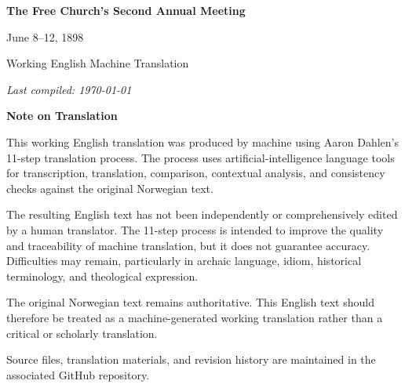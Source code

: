 \documentclass[12pt]{article}
\begin{document}
\begin{titlepage}
    \centering
    \vspace*{1.5in}

    {\LARGE\bfseries The Free Church’s Second Annual Meeting
 \par}

	\vspace{0.35in}
	{June 8–12, 1898\par}




    \vfill

    {\large Working English Machine Translation\par}
    \vspace{0.15in}


    \vspace{0.15in}
	
	\noindent\textit{Last compiled: \today}

\end{titlepage}



\pagestyle{plain}
\tableofcontents
\newpage


\textbf{Note on Translation}

This working English translation was produced by machine using Aaron Dahlen's 11-step translation process. The process uses artificial-intelligence language tools for transcription, translation, comparison, contextual analysis, and consistency checks against the original Norwegian text.

The resulting English text has not been independently or comprehensively edited by a human translator. The 11-step process is intended to improve the quality and traceability of machine translation, but it does not guarantee accuracy. Difficulties may remain, particularly in archaic language, idiom, historical terminology, and theological expression.

The original Norwegian text remains authoritative. This English text should therefore be treated as a machine-generated working translation rather than a critical or scholarly translation.

Source files, translation materials, and revision history are maintained in the associated GitHub repository.


\newpage
{}





\end{document}
